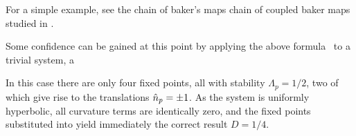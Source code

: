 For a simple example, see the chain of baker's maps chain of coupled
baker maps studied in .

Some confidence can be gained at this point by applying the above
formula~ to a trivial system, a

In this case there are only four fixed points, all with
stability $\Lambda_p=1/2$, two of
which give rise to the translations $\hat n_{p}=\pm 1$.
As the system is
uniformly hyperbolic, all curvature terms are identically zero,
and the fixed points substituted into  yield
immediately the correct result $D=1/4$.
